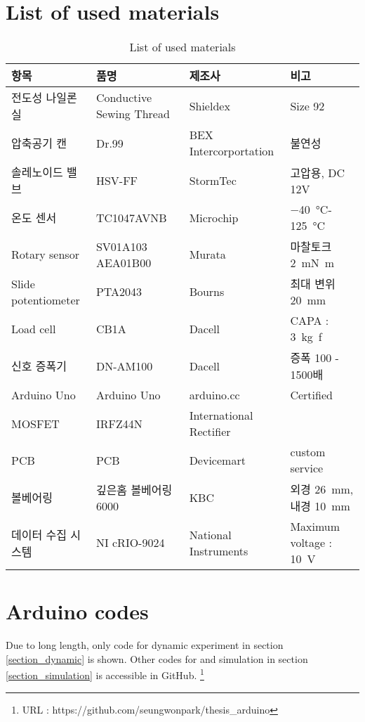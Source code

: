 \section{List of used materials}
\begin{table}[h]
	\caption{List of used materials}
	\label{used_materials}
	\begin{center}
		\begin{tabular}{p{}||p{}|p{}|p{}}
			\hline
			항목 & 품명 & 제조사 & 비고 \\
			\hline
			\hline
			전도성 나일론 실 & \small{Conductive Sewing Thread} & Shieldex & Size 92\\
			\hline
			압축공기 캔 & Dr.99 & \small{BEX Intercorportation} & 불연성 \\
			\hline
			솔레노이드 밸브 & HSV-FF & StormTec & 고압용, DC 12V \\
			\hline
			온도 센서 & TC1047AVNB & Microchip & \small{\SI{-40}{\degreeCelsius}-\SI{125}{\degreeCelsius}} \\
			\hline
			Rotary sensor & \small{SV01A103 AEA01B00} & Murata & 마찰토크 \SI{2}{\milli\newton \meter}\\
			\hline
			Slide potentiometer & PTA2043 & Bourns & 최대 변위 \SI{20}{\milli\meter}\\
			\hline
			Load cell & CB1A & Dacell & CAPA : \SI{3}{\kg f} \\
			\hline
			신호 증폭기 & DN-AM100 & Dacell & 증폭 100 - 1500배 \\
			\hline
			Arduino Uno & Arduino Uno & arduino.cc & Certified \\
			\hline
			MOSFET & IRFZ44N & International Rectifier & \\
			\hline
			PCB & PCB & Devicemart & custom service \\
			\hline
			볼베어링 & 깊은홈 볼베어링 6000 & KBC & 외경 \SI{26}{\milli\meter}, 내경 \SI{10}{\milli\meter}\\
			\hline
			데이터 수집 시스템 & NI cRIO-9024 & \small{National Instruments} & Maximum voltage : \SI{10}{\volt} \\
			\hline
		\end{tabular}
	\end{center}
\end{table}

\section{Arduino codes}
Due to long length, only code for dynamic experiment in section \ref{section_dynamic} is shown. Other codes for \apc and simulation in section \ref{section_simulation} is accessible in GitHub.
\footnote{URL : https://github.com/seungwonpark/thesis\_arduino}

